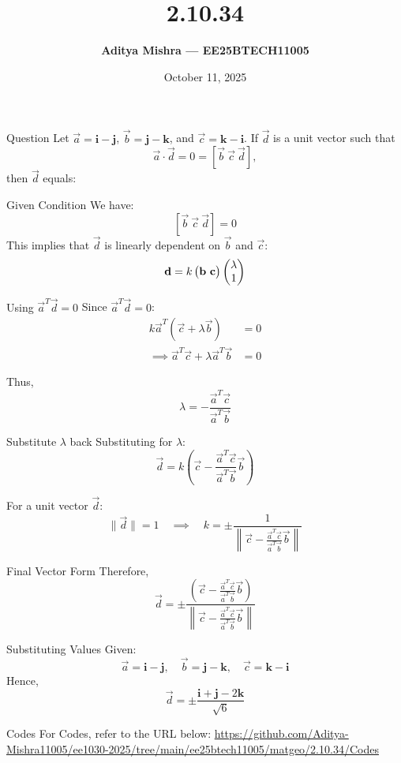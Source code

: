 \documentclass{beamer}
\title{\textbf{2.10.34}}
\author{\textbf{Aditya Mishra — EE25BTECH11005}}
\date{October 11, 2025}
\begin{document}
\begin{frame}
\titlepage
\end{frame}

\begin{frame}{Question}
Let $\vec{a} = \mathbf{i} - \mathbf{j}$, $\vec{b} = \mathbf{j} - \mathbf{k}$, and $\vec{c} = \mathbf{k} - \mathbf{i}$.  
If $\vec{d}$ is a unit vector such that  
\[
\vec{a} \cdot \vec{d} = 0 = [\vec{b}~\vec{c}~\vec{d}],
\]
then $\vec{d}$ equals:

\end{frame}


\begin{frame}{Given Condition}
We have:
\[
[\vec{b}~\vec{c}~\vec{d}] = 0
\]
This implies that $\vec{d}$ is linearly dependent on $\vec{b}$ and $\vec{c}$:
\[
\vec{d} = k\myvec{\vec{b} \ \vec{c}}\myvec{\lambda \\ 1}
\]
\end{frame}
\begin{frame}{Using $\vec{a}^T \vec{d} = 0$}
Since $\vec{a}^T \vec{d} = 0$:
\begin{align*}
k\vec{a}^T (\vec{c} + \lambda \vec{b}) &= 0 \\
\implies \vec{a}^T \vec{c} + \lambda \vec{a}^T \vec{b} &= 0
\end{align*}

Thus,
\[
\lambda = -\frac{\vec{a}^T \vec{c}}{\vec{a}^T \vec{b}}
\]
\end{frame}

\begin{frame}{Substitute $\lambda$ back}
Substituting for $\lambda$:
\[
\vec{d} = k\left(\vec{c} - \frac{\vec{a}^T \vec{c}}{\vec{a}^T \vec{b}}\vec{b}\right)
\]

For a unit vector $\vec{d}$:
\[
\|\vec{d}\| = 1 \quad \implies \quad 
k = \pm \frac{1}{\left\|\vec{c} - \frac{\vec{a}^T \vec{c}}{\vec{a}^T \vec{b}}\vec{b}\right\|}
\]
\end{frame}
\begin{frame}{Final Vector Form}
Therefore,
\[
\vec{d} = \pm \frac{(
\vec{c} - \frac{\vec{a}^T \vec{c}}{\vec{a}^T \vec{b}} \vec{b})
}{
\left\|\vec{c} - \frac{\vec{a}^T \vec{c}}{\vec{a}^T \vec{b}} \vec{b}\right\|
}
\]
\end{frame}
\begin{frame}{Substituting Values}
Given:
\[
\vec{a} = \mathbf{i} - \mathbf{j}, \quad 
\vec{b} = \mathbf{j} - \mathbf{k}, \quad 
\vec{c} = \mathbf{k} - \mathbf{i}
\]
Hence,
\[
\boxed{
\vec{d} = \pm \frac{\mathbf{i} + \mathbf{j} - 2\mathbf{k}}{\sqrt{6}}
}
\]

\end{frame}
\begin{frame}{Codes}
\centering
For Codes, refer to the URL below:  
\url{https://github.com/Aditya-Mishra11005/ee1030-2025/tree/main/ee25btech11005/matgeo/2.10.34/Codes}
\end{frame}
\end{document}
